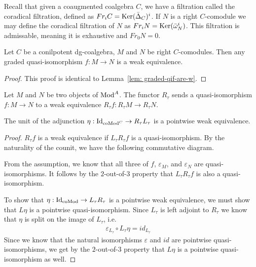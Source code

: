 \documentclass[../thesis.tex]{subfiles}
\begin{document}
            Recall that given a coaugmented coalgebra $C$, we have a filtration called the coradical filtration, defined as $Fr_iC = \tt{Ker}(\bar{\Delta}_C)^i$. If $N$ is a right $C$-comodule we may define the coradical filtration of $N$ as $Fr_iN = \tt{Ker}(\bar{\omega}_N^i)$. This filtration is admissable, meaning it is exhaustive and $Fr_0N=0$.

            \begin{lemma}
                Let $C$ be a conilpotent dg-coalgebra, $M$ and $N$ be right $C$-comodules. Then any graded quasi-isomorphism $f: M \rightarrow N$ is a weak equivalence.
            \end{lemma}

            \begin{proof}
                This proof is identical to Lemma~\ref{lem: graded-qif-are-w}.   
            \end{proof}

            \begin{lemma}
                Let $M$ and $N$ be two objects of $\tt{Mod}^A$. The functor $R_\tau$ sends a quasi-isomorphism $f: M \rightarrow N$ to a weak equivalence $R_\tau f: R_\tau M \rightarrow R_\tau N$.

                The unit of the adjunction $\eta: \tt{Id}_{\tt{coMod}^C} \rightarrow R_\tau L_\tau$ is a pointwise weak equivalence.
            \end{lemma}

            \begin{proof}
                $R_\tau f$ is a weak equivalence if $L_\tau R_\tau f$ is a quasi-isomorphism. By the naturality of the counit, we have the following commutative diagram.
                \begin{center}
                \end{center}

                From the assumption, we know that all three of $f$, $\varepsilon_M$, and $\varepsilon_N$ are quasi-isomorphisms. It follows by the $2$-out-of-$3$ property that $L_\tau R_\tau f$ is also a quasi-isomorphism.

                To show that $\eta: \tt{Id}_{\tt{coMod}} \rightarrow L_\tau R_\tau$ is a pointwise weak equivalence, we must show that $L\eta$ is a pointwise quasi-isomorphism. Since $L_\tau$ is left adjoint to $R_\tau$ we know that $\eta$ is split on the image of $L_\tau$, i.e.
                \begin{align*}
                    \varepsilon_{L_\tau}\circ L_\tau\eta = id_{L_\tau}
                \end{align*}
                Since we know that the natural isomorphisms $\varepsilon$ and $id$ are pointwise quasi-isomorphisms, we get by the $2$-out-of-$3$ property that $L\eta$ is a pointwise quasi-isomorphism as well.
            \end{proof}
\end{document}
